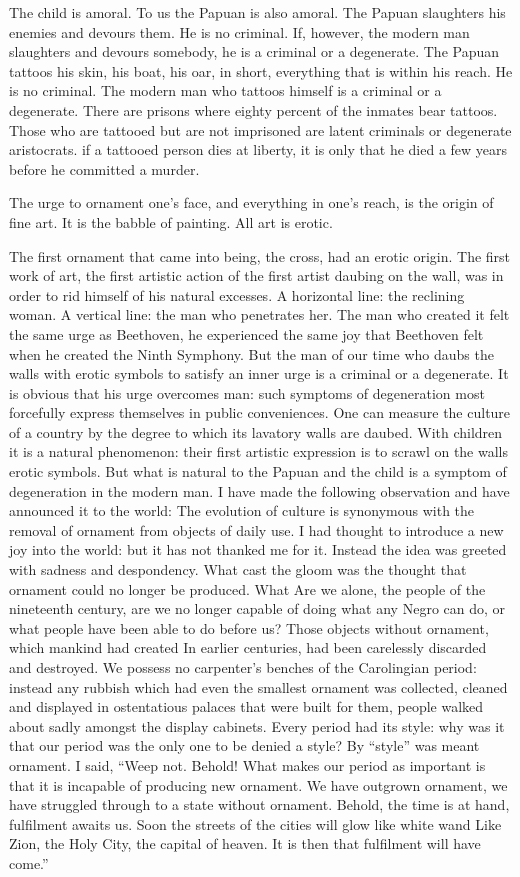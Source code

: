 \documentclass[a4paper]{article}
\begin{document}
The child is amoral. To us the Papuan is also amoral. The Papuan slaughters his enemies and devours them. He is no criminal. If, however, the modern man slaughters and devours somebody, he is a criminal or a degenerate. The Papuan tattoos his skin, his boat, his oar, in short, everything that is within his reach. He is no criminal. The modern man who tattoos himself is a criminal or a degenerate. There are prisons where eighty percent of the inmates bear tattoos. Those who are tattooed but are not imprisoned are latent criminals or degenerate aristocrats. if a tattooed person dies at liberty, it is only that he died a few years before he committed a murder.

The urge to ornament one’s face, and everything in one’s reach, is the origin of fine art. It is the babble of painting. All art is erotic.

The first ornament that came into being, the cross, had an erotic origin. The first work of art, the first artistic action of the first artist daubing on the wall, was in order to rid himself of his natural excesses. A horizontal line: the reclining woman. A vertical line: the man who penetrates her. The man who created it felt the same urge as Beethoven, he experienced the same joy that Beethoven felt when he created the Ninth Symphony.
But the man of our time who daubs the walls with erotic symbols to satisfy an inner urge is a criminal or a degenerate. It is obvious that his urge overcomes man: such symptoms of degeneration most forcefully express themselves in public conveniences. One can measure the culture of a country by the degree to which its lavatory walls are daubed. With children it is a natural phenomenon: their first artistic expression is to scrawl on the walls erotic symbols. But what is natural to the Papuan and the child is a symptom of degeneration in the modern man. I have made the following observation and have announced it to the world: The evolution of culture is synonymous with the removal of ornament from objects of daily use. I had thought to introduce a new joy into the world: but it has not thanked me for it. Instead the idea was greeted with sadness and despondency. What cast the gloom was the thought that ornament could no longer be produced. What Are we alone, the people of the nineteenth century, are we no longer capable of doing what any Negro can do, or what people have been able to do before us?
Those objects without ornament, which mankind had created In earlier centuries, had been carelessly discarded and destroyed. We possess no carpenter’s benches of the Carolingian period: instead any rubbish which had even the smallest ornament was collected, cleaned and displayed in ostentatious palaces that were built for them, people walked about sadly amongst the display cabinets. Every period had its style: why was it that our period was the only one to be denied a style? By “style” was meant ornament. I said, “Weep not. Behold! What makes our period as important is that it is incapable of producing new ornament. We have outgrown ornament, we have struggled through to a state without ornament. Behold, the time is at hand, fulfilment awaits us. Soon the streets of the cities will glow like white wand Like Zion, the Holy City, the capital of heaven. It is then that fulfilment will have come.”
\end{document}
